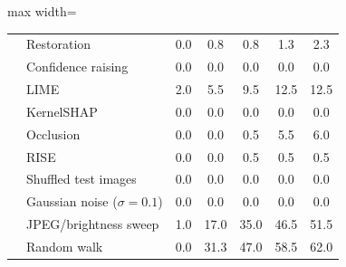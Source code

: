 \begin{table}[!tbp]
\begin{adjustbox}{max width=\textwidth}
\begin{tabular}{llccccc}
 & Restoration & 0.0 & 0.8 & 0.8 & 1.3 & 2.3 \\
 & Confidence raising & 0.0 & 0.0 & 0.0 & 0.0 & 0.0 \\
 & LIME & 2.0 & 5.5 & 9.5 & 12.5 & 12.5 \\
 & KernelSHAP & 0.0 & 0.0 & 0.0 & 0.0 & 0.0 \\
 & Occlusion & 0.0 & 0.0 & 0.5 & 5.5 & 6.0 \\
 & RISE & 0.0 & 0.0 & 0.5 & 0.5 & 0.5 \\
 & Shuffled test images & 0.0 & 0.0 & 0.0 & 0.0 & 0.0 \\
 & Gaussian noise ($\sigma=0.1$) & 0.0 & 0.0 & 0.0 & 0.0 & 0.0 \\
 & JPEG/brightness sweep & 1.0 & 17.0 & 35.0 & 46.5 & 51.5 \\
 & Random walk & 0.0 & 31.3 & 47.0 & 58.5 & 62.0 \\
\bottomrule
\end{tabular}
\end{adjustbox}
\end{table}
